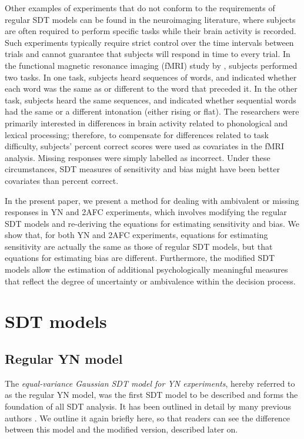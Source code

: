\documentclass[man]{apa6}
\begin{document}
Other examples of experiments that do not conform to the requirements of regular SDT models can be found in the neuroimaging literature, where subjects are often required to perform specific tasks while their brain activity is recorded. Such experiments typically require strict control over the time intervals between trials and cannot guarantee that subjects will respond in time to every trial. In the functional magnetic resonance imaging (fMRI) study by \textcite{kreitewolfhemispheric2014}, subjects performed two tasks. In one task, subjects heard sequences of words, and indicated whether each word was the same as or different to the word that preceded it. In the other task, subjects heard the same sequences, and indicated whether sequential words had the same or a different intonation (either rising or flat). The researchers were primarily interested in differences in brain activity related to phonological and lexical processing; therefore, to compensate for differences related to task difficulty, subjects' percent correct scores were used as covariates in the fMRI analysis. Missing responses were simply labelled as incorrect. Under these circumstances, SDT measures of sensitivity and bias might have been better covariates than percent correct.

In the present paper, we present a method for dealing with ambivalent or missing responses in YN and 2AFC experiments, which involves modifying the regular SDT models and re-deriving the equations for estimating sensitivity and bias. We show that, for both YN and 2AFC experiments, equations for estimating sensitivity are actually the same as those of regular SDT models, but that equations for estimating bias are different. Furthermore, the modified SDT models allow the estimation of additional psychologically meaningful measures that reflect the degree of uncertainty or ambivalence within the decision process.

\section{SDT models}
\subsection{Regular YN model}
The \emph{equal-variance Gaussian SDT model for YN experiments}, hereby referred to as the regular YN model, was the first SDT model to be described \parencite{Peterson1954, Tanner1954} and forms the foundation of all SDT analysis. It has been outlined in detail by many previous authors \parencite[e.g.,][]{Green1966, Macmillan2005}. We outline it again briefly here, so that readers can see the difference between this model and the modified version, described later on.
\end{document}
